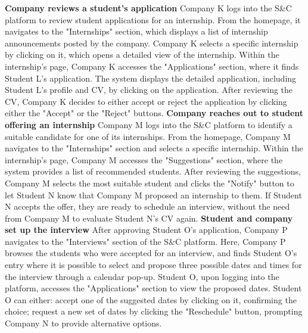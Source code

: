 \newline
\textbf{Company reviews a student's application}\newline
Company K logs into the S\&C platform to review student applications for an internship. From the homepage, it navigates to the "Internships" section, which displays a list of internship announcements posted by the company. Company K selects a specific internship by clicking on it, which opens a detailed view of the internship.
Within the internship's page, Company K accesses the "Applications" section, where it finds Student L's application. The system displays the detailed application, including Student L's profile and CV, by clicking on the application. After reviewing the CV, Company K decides to either accept or reject the application by clicking either the "Accept" or the "Reject" buttons.
\newline
\newline
\textbf{Company reaches out to student offering an internship}\newline
Company M logs into the S\&C platform to identify a suitable candidate for one of its internships. From the homepage, Company M navigates to the "Internships" section and selects a specific internship.
Within the internship's page, Company M accesses the "Suggestions" section, where the system provides a list of recommended students. After reviewing the suggestions, Company M selects the most suitable student and clicks the "Notify" button to let Student N know that Company M proposed an internship to them. If Student N accepts the offer, they are ready to schedule an interview, without the need from Company M to evaluate Student N's CV again.
\newline
\newline
\textbf{Student and company set up the interview}\newline
After approving Student O's application, Company P navigates to the "Interviews" section of the S\&C platform. Here, Company P browses the students who were accepted for an interview, and finds Student O's entry where it is possible to select and propose three possible dates and times for the interview through a calendar pop-up.
Student O, upon logging into the platform, accesses the "Applications" section to view the proposed dates. Student O can either:
accept one of the suggested dates by clicking on it, confirming the choice; 
request a new set of dates by clicking the "Reschedule" button, prompting Company N to provide alternative options.
\newline
